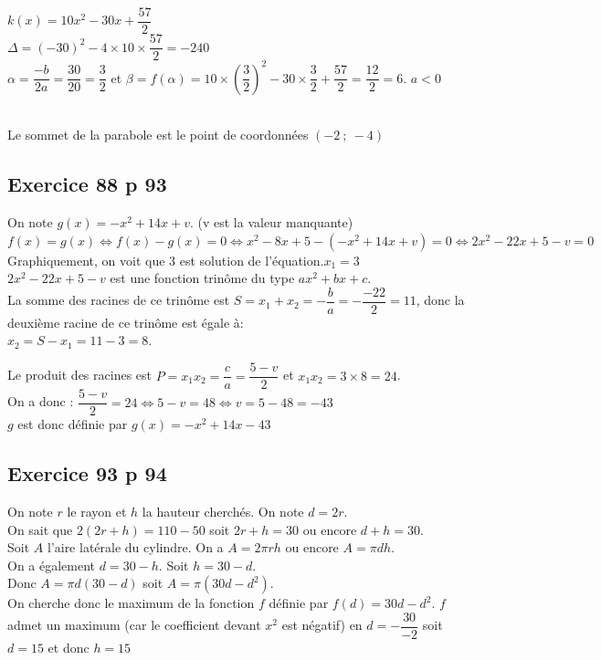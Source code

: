 \documentclass[12pt,a4paper]{book}
\begin{document}
\begin{enumMet}
    \item $k(x)=10 x^{2}-30 x+\dfrac{57}{2}$\\
    $\Delta=(-30)^2-4\times10\times\dfrac{57}{2}=-240$\\
    $\alpha=\dfrac{-b}{2a}=\dfrac{30}{20}=\dfrac{3}{2}$ et $\beta=f(\alpha)=10\times\left(\dfrac{3}{2}\right)^2-30\times\dfrac{3}{2}+\dfrac{57}{2}=\dfrac{12}{2}=6$. $a<0$\\
    \\
    Le sommet de la parabole est le point de coordonnées $\left(-2\ ;\ -4\right)$
\end{enumMet}

\subsection*{Exercice 88 p 93}

\begin{enumMet}
    \item On note $g(x)=-x^{2}+14 x+v$. (v est la valeur manquante) \\
    $f(x)=g(x) \iff f(x)-g(x)=0 \iff x^{2}-8 x+5-\left(-x^{2}+14 x+v\right)=0 \iff 2 x^{2}-22 x+5-v=0$\\
    Graphiquement, on voit que 3 est solution de l'équation.$x_1=3$\\
    $2 x^{2}-22 x+5-v$ est une fonction trinôme du type $ax^2+bx+c$.\\
    La somme des racines de ce trinôme est $S=x_1+x_2=-\dfrac{b}{a}=-\dfrac{-22}{2}=11$, donc la deuxième racine de ce trinôme est égale à:\\
    $x_2=S-x_1=11-3=8$.
    \item Le produit des racines est $P=x_1x_2=\dfrac{c}{a}=\dfrac{5-v}{2}$ et $x_1x_2=3\times8=24$.\\
    On a donc : $\dfrac{5-v}{2}=24 \iff 5-v=48 \iff v=5-48=-43$\\
    $g$ est donc définie par $g(x)=-x^{2}+14 x-43$
\end{enumMet}

 \subsection*{Exercice 93 p 94}
 On note $r$ le rayon et $h$ la hauteur cherchés. On note $d=2 r$.\\
 On sait que $2(2 r+h)=110-50$ soit $2 r+h=30$ ou encore $d+h=30$.\\
 Soit $A$ l'aire latérale du cylindre. On a $A=2 \pi r h$ ou encore $A=\pi d h$.\\
 On a également $d=30-h$. Soit $h=30-d$.\\
 Donc $A=\pi d(30-d)$ soit $A=\pi\left(30 d-d^{2}\right)$.\\
 On cherche donc le maximum de la fonction $f$ définie par $f(d)=30 d-d^{2}$. $f$ admet un maximum (car le coefficient devant $x^{2}$ est négatif) en $d=-\dfrac{30}{-2}$ soit $d=15$ et donc $h=15$
\end{document}
